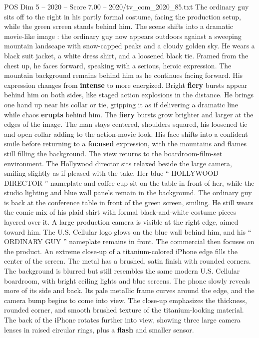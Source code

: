 \begin{textsample}{POS Dim 5 – 2020 – Score 7.00 – 2020/tv\_com\_2020\_85.txt}
The ordinary guy sits off to the right in his partly formal costume, facing the production setup, while the green screen stands behind him.
The scene shifts into a dramatic movie-like image : the ordinary guy now appears outdoors against a sweeping mountain landscape with snow-capped peaks and a cloudy golden sky.
He wears a black suit jacket, a white dress shirt, and a loosened black tie.
Framed from the chest up, he faces forward, speaking with a serious, heroic expression.
The mountain background remains behind him as he continues facing forward.
His expression changes from \textbf{intense} to more energized.
Bright \textbf{fiery} bursts appear behind him on both sides, like staged action explosions in the distance.
He brings one hand up near his collar or tie, gripping it as if delivering a dramatic line while chaos \textbf{erupts} behind him.
The \textbf{fiery} bursts grow brighter and larger at the edges of the image.
The man stays centered, shoulders squared, his loosened tie and open collar adding to the action-movie look.
His face shifts into a confident smile before returning to a \textbf{focused} expression, with the mountains and flames still filling the background.
The view returns to the boardroom-film-set environment.
The Hollywood director sits relaxed beside the large camera, smiling slightly as if pleased with the take.
Her blue “ HOLLYWOOD DIRECTOR ” nameplate and coffee cup sit on the table in front of her, while the studio lighting and blue wall panels remain in the background.
The ordinary guy is back at the conference table in front of the green screen, smiling.
He still wears the comic mix of his plaid shirt with formal black-and-white costume pieces layered over it.
A large production camera is visible at the right edge, aimed toward him.
The U.S.
Cellular logo glows on the blue wall behind him, and his “ ORDINARY GUY ” nameplate remains in front.
The commercial then focuses on the product.
An extreme close-up of a titanium-colored iPhone edge fills the center of the screen.
The metal has a brushed, satin finish with rounded corners.
The background is blurred but still resembles the same modern U.S.
Cellular boardroom, with bright ceiling lights and blue screens.
The phone slowly reveals more of its side and back.
Its pale metallic frame curves around the edge, and the camera bump begins to come into view.
The close-up emphasizes the thickness, rounded corner, and smooth brushed texture of the titanium-looking material.
The back of the iPhone rotates further into view, showing three large camera lenses in raised circular rings, plus a \textbf{flash} and smaller sensor.

\end{textsample}
